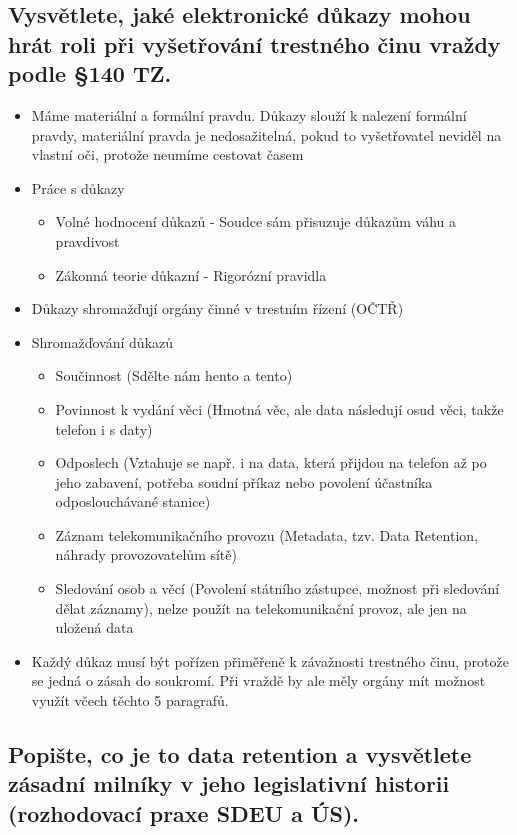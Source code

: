\subsection{Vysvětlete, jaké elektronické důkazy mohou hrát roli při vyšetřování trestného činu vraždy podle §140 TZ.}
\begin{itemize}
    \item Máme materiální a formální pravdu. Důkazy slouží k nalezení formální pravdy, materiální pravda je nedosažitelná, pokud to vyšetřovatel neviděl na vlastní oči, protože neumíme cestovat časem
    \item Práce s důkazy
          \begin{itemize}
              \item Volné hodnocení důkazů - Soudce sám přisuzuje důkazům váhu a pravdivost
              \item Zákonná teorie důkazní - Rigorózní pravidla
          \end{itemize}
    \item Důkazy shromažďují orgány činné v trestním řízení (OČTŘ)
    \item Shromažďování důkazů
          \begin{itemize}
              \item Součinnost (Sdělte nám hento a tento)
              \item Povinnost k vydání věci (Hmotná věc, ale data následují osud věci, takže telefon i s daty)
              \item Odposlech (Vztahuje se např. i na data, která přijdou na telefon až po jeho zabavení, potřeba soudní příkaz nebo povolení účastníka odposlouchávané stanice)
              \item Záznam telekomunikačního provozu (Metadata, tzv. Data Retention, náhrady provozovatelům sítě)
              \item Sledování osob a věcí (Povolení státního zástupce, možnost při sledování dělat záznamy), nelze použít na telekomunikační provoz, ale jen na uložená data
          \end{itemize}
    \item Každý důkaz musí být pořízen přiměřeně k závažnosti trestného činu, protože se jedná o zásah do soukromí. Při vraždě by ale měly orgány mít možnost využít včech těchto 5 paragrafů.
\end{itemize}


\subsection{Popište, co je to data retention a vysvětlete zásadní milníky v jeho legislativní historii (rozhodovací praxe SDEU a ÚS).}

